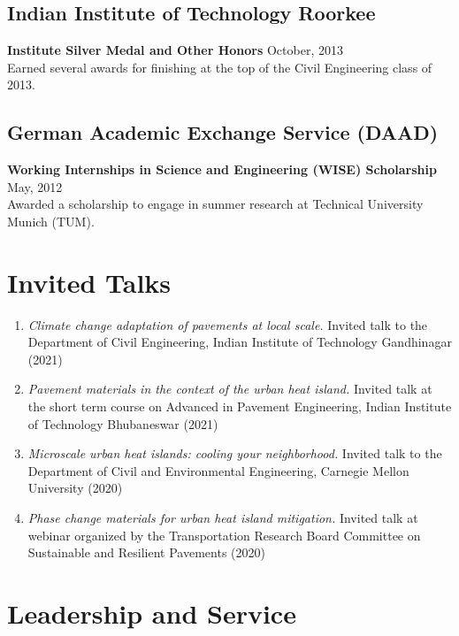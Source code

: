 \documentclass[12pt]{article}
\begin{document}
\subsection*{Indian Institute of Technology Roorkee} 
\textbf{Institute Silver Medal and Other Honors} \hfill October, 2013 \\
Earned several awards for finishing at the top of the Civil Engineering class of 2013.

\subsection*{German Academic Exchange Service (DAAD)}
\textbf{Working Internships in Science and Engineering (WISE) Scholarship} \hfill May, 2012 \\
Awarded a scholarship to engage in summer research at Technical University Munich (TUM). 

\bigskip
\section*{Invited Talks}
\begin{enumerate}[label=(N\arabic*)]
	\item \textit{Climate change adaptation of pavements at local scale.} Invited talk to the Department of Civil Engineering, Indian Institute of Technology Gandhinagar (2021)	
	\item \textit{Pavement materials in the context of the urban heat island.} Invited talk at the short term course on Advanced in Pavement Engineering, Indian Institute of Technology Bhubaneswar (2021)	
	\item \textit{Microscale urban heat islands: cooling your neighborhood.} Invited talk to the Department of Civil and Environmental Engineering, Carnegie Mellon University (2020)
	\item \textit{Phase change materials for urban heat island mitigation.} Invited talk at webinar organized by the Transportation Research Board Committee on Sustainable and Resilient Pavements (2020)
\end{enumerate}

\bigskip
\section*{Leadership and Service}
\end{document}

